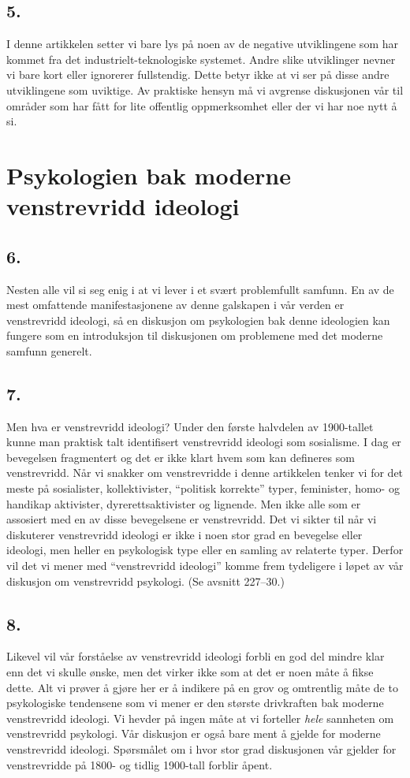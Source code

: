 \documentclass[oneside]{book}
\begin{document}
\section*{5.}
I denne artikkelen setter vi bare lys på noen av de negative utviklingene som
har kommet fra det industrielt-teknologiske systemet. Andre slike utviklinger
nevner vi bare kort eller ignorerer fullstendig. Dette betyr ikke at vi ser på
disse andre utviklingene som uviktige. Av praktiske hensyn må vi avgrense
diskusjonen vår til områder som har fått for lite offentlig oppmerksomhet eller
der vi har noe nytt å si.

\chapter{Psykologien bak moderne venstrevridd ideologi}
\section*{6.}
Nesten alle vil si seg enig i at vi lever i et svært problemfullt samfunn. En
av de mest omfattende manifestasjonene av denne galskapen i vår verden er
venstrevridd ideologi, så en diskusjon om psykologien bak denne ideologien kan
fungere som en introduksjon til diskusjonen om problemene med det moderne
samfunn generelt.

\section*{7.}
Men hva er venstrevridd ideologi? Under den første halvdelen av 1900-tallet
kunne man praktisk talt identifisert venstrevridd ideologi som sosialisme. I
dag er bevegelsen fragmentert og det er ikke klart hvem som kan defineres som
venstrevridd. Når vi snakker om venstrevridde i denne artikkelen tenker vi for
det meste på sosialister, kollektivister, ``politisk korrekte'' typer,
feminister, homo- og handikap aktivister, dyrerettsaktivister og lignende. Men
ikke alle som er assosiert med en av disse bevegelsene er venstrevridd. Det vi
sikter til når vi diskuterer venstrevridd ideologi er ikke i noen stor grad en
bevegelse eller ideologi, men heller en psykologisk type eller en samling av
relaterte typer. Derfor vil det vi mener med ``venstrevridd ideologi'' komme
frem tydeligere i løpet av vår diskusjon om venstrevridd psykologi. (Se avsnitt
227--30.)

\section*{8.}
Likevel vil vår forståelse av venstrevridd ideologi forbli en god del mindre
klar enn det vi skulle ønske, men det virker ikke som at det er noen måte å
fikse dette. Alt vi prøver å gjøre her er å indikere på en grov og omtrentlig
måte de to psykologiske tendensene som vi mener er den største drivkraften bak
moderne venstrevridd ideologi. Vi hevder på ingen måte at vi forteller {\em
hele} sannheten om venstrevridd psykologi. Vår diskusjon er også bare ment å
gjelde for moderne venstrevridd ideologi. Spørsmålet om i hvor stor grad
diskusjonen vår gjelder for venstrevridde på 1800- og tidlig 1900-tall forblir
åpent.
\end{document}
